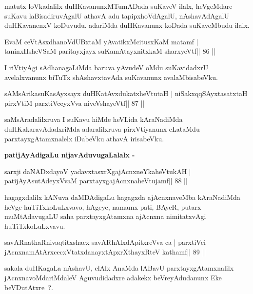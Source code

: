 \begin{artha}
matutx loVkadalilx duHKavanunxMTumADada suKaveV ilalx, heVgeMdare suKavu laBisadiruvAgalU athavA adu tapipxhoVdAgalU, nAshavAdAgalU duHKavanenxV koDuvudu. adariMda duHKavanunx koDada suKaveMbudu ilalx.
\end{artha}

\begin{shl}
EvaM ceVtAsxdhanoVdUBxtaM yAvatikxMcitusxKaM matamf |
taninxHsheVSaM paritayxjayx suKamAtayxnitxkaM sharxyeVtf\hfill || 86 ||
\end{shl}

\begin{artha}
I riVtiyAgi sAdhanagaLiMda baruva yAvudeV oMdu suKavidadxrU avelalxvanunx biTuTx shAshavxtavAda suKavanunx avalaMbisabeVku.
\end{artha}

\begin{shl}
sAMsArikasuKasAyxsayx duHKatAvxdukatxheVtutaH |
niSakxqqSAyxtasatxtaH pirxVtiM parxtiVceyxVva niveVshayeVtf\hfill || 87 ||
\end{shl}

\begin{artha}
saMsAradalilxruva I suKavu hiMde heVLida kAraNadiMda duHKakaravAdadxriMda adaralilxruva pirxVtiyanunx eLataMdu parxtayxgAtamxnalelx iDabeVku athavA irisabeVku.
\end{artha}

\begin{artha}
\textbf{patijAyAdigaLu nijavAduvugaLalalx -}
\end{artha}

\begin{shl}
sarxji daNADxdayoV yadavxtasxrXgajAcnxneYkaheVtukAH |
patijAyAsutAdeyxVvaM parxtayxgajAcnxnaheVtujamf\hfill || 88 ||
\end{shl}

\begin{artha}
hagagxdalilx kANuva daMDAdigaLu hagagxda ajAcnxnaveMba kAraNadiMda heVge huTiTxkoLuLxvavo, hAgeye, namamx pati, BAyeR, putarx muMtAdavugaLU saha parxtayxgAtamxna ajAcnxna nimitatxvAgi huTiTxkoLuLxvavu.
\end{artha}

\begin{shl}
savARnathaRnivaqtitxshacx savARhAlxdApitxreVva ca |
parxtiVci jAcnxnamAtArxcecxVtatxdanayxtApxrXthayxRteV kathamf\hfill || 89 ||
\end{shl}

\begin{artha}
sakala duHKagaLa nAshavU, elAlx AnaMda lABavU parxtayxgAtamxnalilx
jAcnxnavoMdariMdaleV Aguvudidadxre adakekx beVreyAdudanunx Eke
beVDutAtxre~?.
\end{artha}


